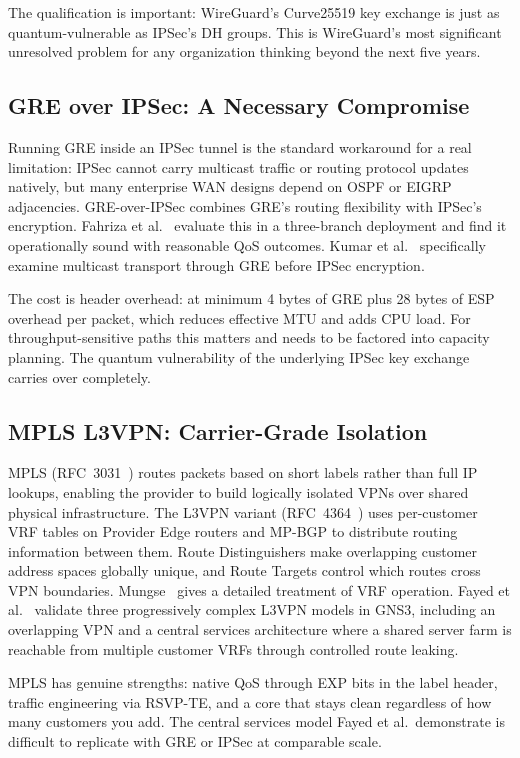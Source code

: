 \documentclass[conference]{IEEEtran}
\begin{document}
The qualification is important: WireGuard's Curve25519 key
exchange is just as quantum-vulnerable as IPSec's DH groups.
This is WireGuard's most significant unresolved problem for
any organization thinking beyond the next five years.

\subsection{GRE over IPSec: A Necessary Compromise}

Running GRE inside an IPSec tunnel is the standard workaround
for a real limitation: IPSec cannot carry multicast traffic
or routing protocol updates natively, but many enterprise WAN
designs depend on OSPF or EIGRP adjacencies. GRE-over-IPSec
combines GRE's routing flexibility with IPSec's encryption.
Fahriza et al.~\cite{fahriza2026} evaluate this in a three-branch
deployment and find it operationally sound with reasonable QoS
outcomes. Kumar et al.~\cite{kumar2020} specifically examine
multicast transport through GRE before IPSec encryption.

The cost is header overhead: at minimum 4 bytes of GRE plus
28 bytes of ESP overhead per packet, which reduces effective
MTU and adds CPU load. For throughput-sensitive paths this
matters and needs to be factored into capacity planning.
The quantum vulnerability of the underlying IPSec key exchange
carries over completely.

\subsection{MPLS L3VPN: Carrier-Grade Isolation}

MPLS (RFC~3031~\cite{rfc3031}) routes packets based on
short labels rather than full IP lookups, enabling the
provider to build logically isolated VPNs over shared physical
infrastructure. The L3VPN variant (RFC~4364~\cite{rfc4364})
uses per-customer VRF tables on Provider Edge routers and
MP-BGP to distribute routing information between them. Route
Distinguishers make overlapping customer address spaces
globally unique, and Route Targets control which routes cross
VPN boundaries. Mungse~\cite{mungse2023} gives a detailed
treatment of VRF operation. Fayed et al.~\cite{fayed2024}
validate three progressively complex L3VPN models in GNS3,
including an overlapping VPN and a central services
architecture where a shared server farm is reachable from
multiple customer VRFs through controlled route leaking.

MPLS has genuine strengths: native QoS through EXP bits in
the label header, traffic engineering via RSVP-TE, and a
core that stays clean regardless of how many customers
you add. The central services model Fayed et al.\ demonstrate
is difficult to replicate with GRE or IPSec at comparable
scale.
\end{document}
